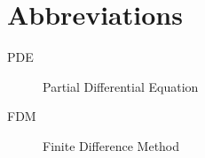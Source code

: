 \chapter{Abbreviations}

\begin{description}
	\item[PDE] Partial Differential Equation
	\item[FDM] Finite Difference Method
\end{description}
